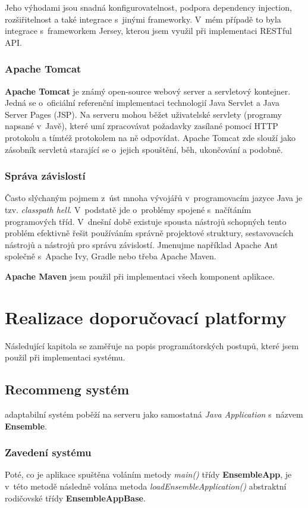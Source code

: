 \documentclass[thesis=M,czech]{FITthesis}[2014/05/07]
\begin{document}
Jeho výhodami jsou snadná konfigurovatelnost, podpora dependency injection, rozšiřitelnost a také integrace s~jinými frameworky. V~mém případě to byla integrace s~frameworkem Jersey, kterou jsem využil při implementaci RESTful API.

\subsubsection{Apache Tomcat}
\textbf{Apache Tomcat} je známý open-source webový server a servletový kontejner. Jedná se o~oficiální referenční implementaci technologií Java Servlet a Java Server Pages (JSP). Na serveru mohou běžet uživatelské servlety (programy napsané v~Javě), které umí zpracovávat požadavky zasílané pomocí HTTP protokolu a tímtéž protokolem na ně odpovídat. Apache Tomcat zde slouží jako zásobník servletů starající se o~jejich spouštění, běh, ukončování a podobně.

\subsubsection{Správa závislostí}
Často slýchaným pojmem z~úst mnoha vývojářů v~programovacím jazyce Java je tzv. \emph{classpath hell}. V~podstatě jde o~problémy spojené s~načítáním programových tříd. V~dnešní době existuje spousta nástrojů schopných tento problém efektivně řešit používáním správně projektové struktury, sestavovacích nástrojů a nástrojů pro správu závislostí. Jmenujme například Apache Ant společně s~Apache Ivy, Gradle nebo třeba Apache Maven.

\textbf{Apache Maven} jsem použil při implementaci všech komponent aplikace.

\section{Realizace doporučovací platformy}
\label{chap:impl}

Následující kapitola se zaměřuje na popis programátorských postupů, které jsem použil při implementaci systému.

\subsection{Recommeng systém}
\label{sec:impl}

adaptabilní systém poběží na serveru jako samostatná \emph{Java Application} s~názvem \textbf{Ensemble}.

\subsubsection{Zavedení systému}
Poté, co je aplikace spuštěna voláním metody \emph{main()} třídy \textbf{EnsembleApp}, je v~této metodě následně volána metoda \emph{loadEnsembleApplication()} abstraktní rodičovské třídy \textbf{EnsembleAppBase}.
\end{document}
